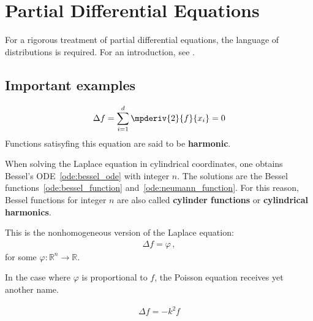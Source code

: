 \chapter{Partial Differential Equations}\label{chapter:pde}

    For a rigorous treatment of partial differential equations, the language of distributions is required. For an introduction, see .

    \minitoc

\section{Important examples}

    \begin{example}\label{pde:laplace_equation}
        \begin{gather}
            \Delta f = \sum_{i=1}^d\mpderiv{2}{f}{x_i}=0
        \end{gather}
        Functions satisyfing this equation are said to be \textbf{harmonic}.
    \end{example}

    When solving the Laplace equation in cylindrical coordinates, one obtains Bessel's ODE~\eqref{ode:bessel_ode} with integer $n$. The solutions are the Bessel functions~\eqref{ode:bessel_function} and~\eqref{ode:neumann_function}. For this reason, Bessel functions for integer $n$ are also called \textbf{cylinder functions} or \textbf{cylindrical harmonics}.

    \begin{example}
        This is the nonhomogeneous version of the Laplace equation:
        \begin{gather}
            \Delta f = \varphi\,,
        \end{gather}
        for some $\varphi:\mathbb{R}^n\rightarrow\mathbb{R}$.
    \end{example}

    In the case where $\varphi$ is proportional to $f$, the Poisson equation receives yet another name.
    \begin{example}\label{pde:helmholtz_equation}
        \begin{gather}
            \Delta f = -k^2f
        \end{gather}
    \end{example}


